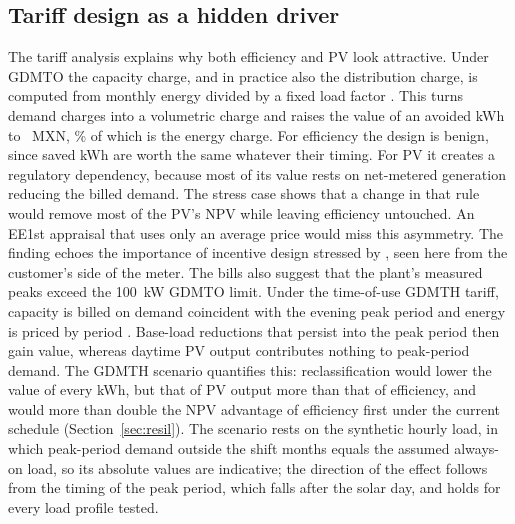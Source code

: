\documentclass[preprint,12pt,authoryear]{elsarticle}
\newcommand{\MXN}{MXN}
\begin{document}
\subsection{Tariff design as a hidden driver}
The tariff analysis explains why both efficiency and PV look attractive. Under GDMTO the capacity charge, and in practice also the distribution charge, is computed from monthly energy divided by a fixed load factor \citep{dof2025tariffs}. This turns demand charges into a volumetric charge and raises the value of an avoided kWh to \nTMarg~\MXN, \nTEnergyShare\% of which is the energy charge. For efficiency the design is benign, since saved kWh are worth the same whatever their timing. For PV it creates a regulatory dependency, because most of its value rests on net-metered generation reducing the billed demand. The stress case shows that a change in that rule would remove most of the PV's NPV while leaving efficiency untouched. An EE1st appraisal that uses only an average price would miss this asymmetry. The finding echoes the importance of incentive design stressed by \citet{pato2022}, seen here from the customer's side of the meter. The bills also suggest that the plant's measured peaks exceed the 100~kW GDMTO limit. Under the time-of-use GDMTH tariff, capacity is billed on demand coincident with the evening peak period and energy is priced by period \citep{dof2025tariffs}. Base-load reductions that persist into the peak period then gain value, whereas daytime PV output contributes nothing to peak-period demand. The GDMTH scenario quantifies this: reclassification would lower the value of every kWh, but that of PV output more than that of efficiency, and would more than double the NPV advantage of efficiency first under the current schedule (Section~\ref{sec:resil}). The scenario rests on the synthetic hourly load, in which peak-period demand outside the shift months equals the assumed always-on load, so its absolute values are indicative; the direction of the effect follows from the timing of the peak period, which falls after the solar day, and holds for every load profile tested.
\end{document}

